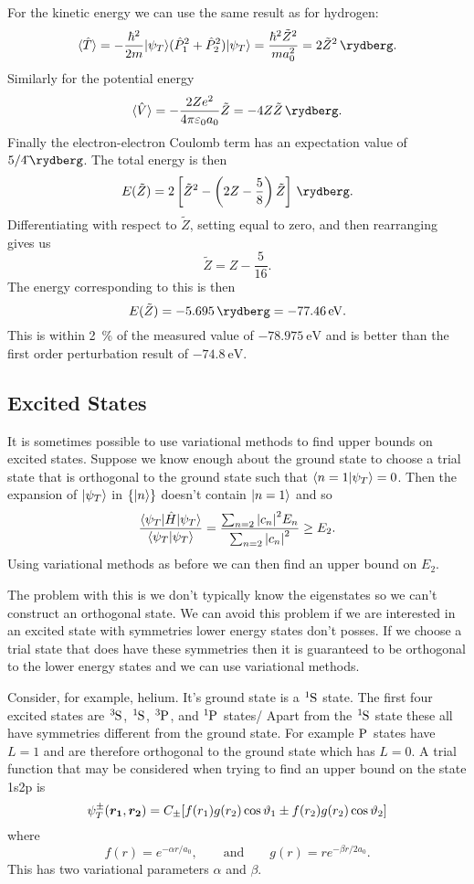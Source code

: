     For the kinetic energy we can use the same result as for hydrogen:
    \[\expected{\operator{T}} = -\frac{\hbar^2}{2m}\ket{\psi_T}(\operator{P}_1^2 + \operator{P}_2^2)\ket{\psi_T} = \frac{\hbar^2 \tilde{Z}^2}{ma_0^2} = 2\tilde{Z}^2\,\si{\rydberg}.\]
    Similarly for the potential energy
    \[\expected{\operator{V}} = -\frac{2Ze^2}{4\pi\varepsilon_0a_0} \tilde{Z} = -4Z\tilde{Z}\,\si{\rydberg}.\]
    Finally the electron-electron Coulomb term has an expectation value of \(5/4\tilde\,\si{\rydberg}\).
    The total energy is then
    \[E(\tilde{Z}) = 2\left[\tilde{Z}^2 - \left(2Z - \frac{5}{8}\right)\tilde{Z}\right] \,\si{\rydberg}.\]
    Differentiating with respect to \(\tilde{Z}\), setting equal to zero, and then rearranging gives us
    \[\tilde{Z} = Z - \frac{5}{16}.\]
    The energy corresponding to this is then
    \[E(\tilde{Z}) = \SI{-5.695}{\rydberg} = \SI{-77.46}{\electronvolt}.\]
    This is within \SI{2}{\percent} of the measured value of \(\SI{-78.975}{\electronvolt}\) and is better than the first order perturbation result of \(\SI{-74.8}{\electronvolt}\).
    
    \subsection{Excited States}
    It is sometimes possible to use variational methods to find upper bounds on excited states.
    Suppose we know enough about the ground state to choose a trial state that is orthogonal to the ground state such that \(\langle {n=1} \vert {\psi_T} \rangle = 0\).
    Then the expansion of \(\vert {\psi_T} \rangle\) in \(\{\vert {n} \rangle\}\) doesn't contain \(\vert {n=1} \rangle\) and so
    \[\frac{\langle {\psi_T} \vert\hat{H}\vert {\psi_T} \rangle}{\langle {\psi_T} \vert {\psi_T} \rangle} = \frac{\sum_{n=2}\abs{c_n}^2E_n}{\sum_{n=2} \abs{c_n}^2} \ge E_2.\]
    Using variational methods as before we can then find an upper bound on \(E_2\).
    
    The problem with this is we don't typically know the eigenstates so we can't construct an orthogonal state.
    We can avoid this problem if we are interested in an excited state with symmetries lower energy states don't posses.
    If we choose a trial state that does have these symmetries then it is guaranteed to be orthogonal to the lower energy states and we can use variational methods.
    
    Consider, for example, helium.
    It's ground state is a \(\termNotation{1}{S}{}\) state.
    The first four excited states are \(\termNotation{3}{S}{}\), \(\termNotation{1}{S}{}\), \(\termNotation{3}{P}{}\), and \(\termNotation{1}{P}{}\) states/
    Apart from the \(\termNotation{1}{S}{}\) state these all have symmetries different from the ground state.
    For example \(\termNotation{}{P}{}\) states have \(L = 1\) and are therefore orthogonal to the ground state which has \(L = 0\).
    A trial function that may be considered when trying to find an upper bound on the state 1s2p is
    \[\psi_T^{\pm}(\bm{r_1}, \bm{r_2}) = C_{\pm} [f(r_1)g(r_2)\cos\vartheta_1 \pm f(r_2)g(r_2)\cos\vartheta_2]\]
    where
    \[f(r) = e^{-\alpha r / a_0}, \qquad\text{and}\qquad g(r) = re^{-\beta r/ 2a_0}.\]
    This has two variational parameters \(\alpha\) and \(\beta\).
    